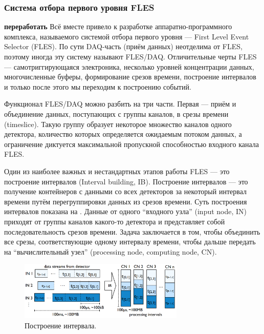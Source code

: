 \subsubsection{Система отбора первого уровня FLES}\label{sec:secFLES}

\textbf{переработать}
Всё вместе привело к разработке аппаратно-программного комплекса, называемого системой отбора первого уровня --- First Level Event Selector (FLES). По сути DAQ-часть (приём данных) неотделима от FLES, поэтому иногда эту систему называют FLES/DAQ.
Отличительные черты FLES --- самотриггирующаяся электроника, несколько уровней концентрации данных, многочисленные буферы, формирование срезов времени, построение интервалов и только после этого мы переходим к построению событий.

Функционал FLES/DAQ можно разбить на три части. Первая --- приём и объединение данных, поступающих с группы каналов, в срезы времени (timeslice). Такую группу образует некоторое множество каналов одного детектора, количество которых определяется ожидаемым потоком данных, а ограничение диктуется максимальной пропускной способностью входного канала FLES.

Один из наиболее важных и нестандартных этапов работы FLES --- это построение интервалов (Interval building, IB). Построение интервалов --- это получение контейнеров с данными со всех детекторов за некоторый интервал времени путём перегруппировки данных из срезов времени. Суть построения интервалов показана на . Данные от одного ``входного узла'' (input node, IN) приходят от группы каналов какого-то детектора и представляет собой последовательность срезов времени. Задача заключается в том, чтобы объединить все срезы, соответствующие одному интервалу времени, чтобы дальше передать на ``вычислительный узел'' (processing node, computing node, CN).

\begin{figure}[H]
\centering
\includegraphics[width=0.7\textwidth]{pictures/Interval_building.png}
\caption{Построение интервала.}
\label{fig:IntervalBuilding}
\end{figure}

